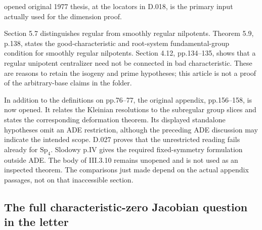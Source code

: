 \begin{description}
opened original 1977 thesis, at the locators in D.018,
is the primary input actually used for the dimension proof.
\item[Springer IHES 30, 1966.] Section 5.7 distinguishes
regular from smoothly regular nilpotents.  Theorem 5.9,
p.138, states the good-characteristic and root-system
fundamental-group condition for smoothly regular
nilpotents.  Section 4.12, pp.134--135, shows that a
regular unipotent centralizer need not be connected in
bad characteristic.  These are reasons to retain the
isogeny and prime hypotheses; this article is not a
proof of the arbitrary-base claims in the folder.
\item[Steinberg LNM 366.] In addition to the definitions
on pp.76--77, the original appendix, pp.156--158, is now
opened.  It relates the Kleinian resolutions to the
subregular group slices and states the corresponding
deformation theorem.  Its displayed standalone hypotheses
omit an ADE restriction, although the preceding ADE
discussion may indicate the intended scope.  D.027 proves
that the unrestricted reading fails already for
$\mathrm{Sp}_4$.  Slodowy p.IV gives the required
fixed-symmetry formulation outside ADE.
The body of III.3.10 remains unopened and is not used as
an inspected theorem.  The comparisons just made depend
on the actual appendix passages, not on that inaccessible
section.
\end{description}

\subsection{The full characteristic-zero Jacobian question in the letter}

